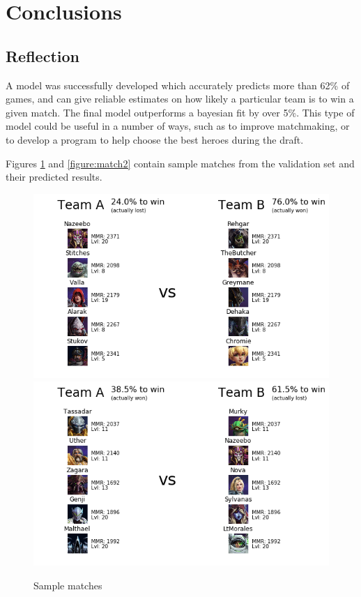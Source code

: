 \documentclass[twoside,twocolumn]{article}
\begin{document}
\section{Conclusions}

\subsection{Reflection}
A model was successfully developed which accurately predicts more than 62\% of games, and can give reliable estimates on how likely a particular team is to win a given match.  The final model outperforms a bayesian fit by over 5\%.  This type of model could be useful in a number of ways, such as to improve matchmaking, or to develop a program to help choose the best heroes during the draft. 

Figures \ref{figure:match1} and \ref{figure:match2} contain sample matches from the validation set and their predicted results.

\begin{figure}
\caption{Sample matches}
\label{figure:match1}
\includegraphics[width=\linewidth]{match1}
\includegraphics[width=\linewidth]{match2}
\centering
\end{figure}
\end{document}
